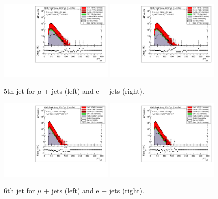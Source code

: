 \begin{figure}[!ht]
    \includegraphics[clip, trim=0.15cm 0.15cm 0.15cm 0.1cm, width=0.49\textwidth]{images/Run1/5thJetPt_StackLogY_Mu.pdf}
    \includegraphics[clip, trim=0.15cm 0.15cm 0.15cm 0.1cm, width=0.49\textwidth]{images/Run1/5thJetPt_StackLogY_e.pdf}
    \caption{5th jet \pt for $\mu$ + jets (left) and e + jets (right).}
    \label{fig:5thjetpt}
\end{figure}

\begin{figure}[!ht]
    \includegraphics[clip, trim=0.15cm 0.15cm 0.15cm 0.1cm, width=0.49\textwidth]{images/Run1/6thJetPt_StackLogY_Mu.pdf}
    \includegraphics[clip, trim=0.15cm 0.15cm 0.15cm 0.1cm, width=0.49\textwidth]{images/Run1/6thJetPt_StackLogY_e.pdf}
    \caption{6th jet \pt for $\mu$ + jets (left) and e + jets (right).}
    \label{fig:6thjetpt}
\end{figure}

